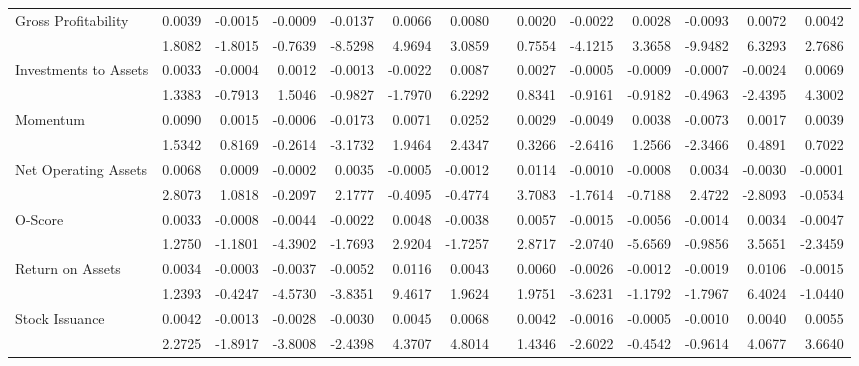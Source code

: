 \begin{table}[h]
{\begin{tabular}{lrrrrrrrrrrrrr}
      Gross Profitability & 0.0039 & -0.0015 & -0.0009 & -0.0137 & 0.0066 & 0.0080 &       & 0.0020 & -0.0022 & 0.0028 & -0.0093 & 0.0072 & 0.0042 \\
            & 1.8082 & -1.8015 & -0.7639 & -8.5298 & 4.9694 & 3.0859 &       & 0.7554 & -4.1215 & 3.3658 & -9.9482 & 6.3293 & 2.7686 \\
      Investments to Assets & 0.0033 & -0.0004 & 0.0012 & -0.0013 & -0.0022 & 0.0087 &       & 0.0027 & -0.0005 & -0.0009 & -0.0007 & -0.0024 & 0.0069 \\
            & 1.3383 & -0.7913 & 1.5046 & -0.9827 & -1.7970 & 6.2292 &       & 0.8341 & -0.9161 & -0.9182 & -0.4963 & -2.4395 & 4.3002 \\
      Momentum & 0.0090 & 0.0015 & -0.0006 & -0.0173 & 0.0071 & 0.0252 &       & 0.0029 & -0.0049 & 0.0038 & -0.0073 & 0.0017 & 0.0039 \\
            & 1.5342 & 0.8169 & -0.2614 & -3.1732 & 1.9464 & 2.4347 &       & 0.3266 & -2.6416 & 1.2566 & -2.3466 & 0.4891 & 0.7022 \\
      Net Operating Assets & 0.0068 & 0.0009 & -0.0002 & 0.0035 & -0.0005 & -0.0012 &       & 0.0114 & -0.0010 & -0.0008 & 0.0034 & -0.0030 & -0.0001 \\
            & 2.8073 & 1.0818 & -0.2097 & 2.1777 & -0.4095 & -0.4774 &       & 3.7083 & -1.7614 & -0.7188 & 2.4722 & -2.8093 & -0.0534 \\
      O-Score & 0.0033 & -0.0008 & -0.0044 & -0.0022 & 0.0048 & -0.0038 &       & 0.0057 & -0.0015 & -0.0056 & -0.0014 & 0.0034 & -0.0047 \\
            & 1.2750 & -1.1801 & -4.3902 & -1.7693 & 2.9204 & -1.7257 &       & 2.8717 & -2.0740 & -5.6569 & -0.9856 & 3.5651 & -2.3459 \\
      Return on Assets & 0.0034 & -0.0003 & -0.0037 & -0.0052 & 0.0116 & 0.0043 &       & 0.0060 & -0.0026 & -0.0012 & -0.0019 & 0.0106 & -0.0015 \\
            & 1.2393 & -0.4247 & -4.5730 & -3.8351 & 9.4617 & 1.9624 &       & 1.9751 & -3.6231 & -1.1792 & -1.7967 & 6.4024 & -1.0440 \\
      Stock Issuance & 0.0042 & -0.0013 & -0.0028 & -0.0030 & 0.0045 & 0.0068 &       & 0.0042 & -0.0016 & -0.0005 & -0.0010 & 0.0040 & 0.0055 \\
            & 2.2725 & -1.8917 & -3.8008 & -2.4398 & 4.3707 & 4.8014 &       & 1.4346 & -2.6022 & -0.4542 & -0.9614 & 4.0677 & 3.6640 \\
      \bottomrule
      \end{tabular}%
    }
    \label{tab:liq-ff5}%
  \end{table}%

